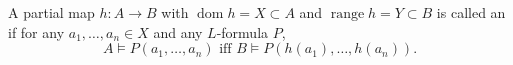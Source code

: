 A partial map $h: A \rightarrow B$ with $\operatorname{dom} h = X \subset A$ and $\operatorname{range} h = Y \subset B$ is called an  if for any $a_1, \ldots, a_n \in X$ and any $L$-formula $P$,
$$A \vDash P(a_1, \ldots, a_n) \text{ iff } B \vDash P(h(a_1), \ldots, h(a_n)).$$
